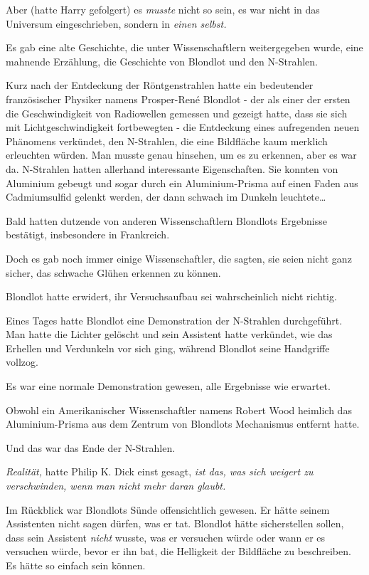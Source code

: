 {Aber (hatte Harry gefolgert) es \emph{musste} nicht so sein, es war nicht in das Universum eingeschrieben, sondern in \emph{einen selbst.}

Es gab eine alte Geschichte, die unter Wissenschaftlern weitergegeben wurde, eine mahnende Erzählung, die Geschichte von Blondlot und den N-Strahlen.

Kurz nach der Entdeckung der Röntgenstrahlen hatte ein bedeutender französischer Physiker namens Prosper-René Blondlot - der als einer der ersten die Geschwindigkeit von Radiowellen gemessen und gezeigt hatte, dass sie sich mit Lichtgeschwindigkeit fortbewegten - die Entdeckung eines aufregenden neuen Phänomens verkündet, den N-Strahlen, die eine Bildfläche kaum merklich erleuchten würden. Man musste genau hinsehen, um es zu erkennen, aber es war da. N-Strahlen hatten allerhand interessante Eigenschaften. Sie konnten von Aluminium gebeugt und sogar durch ein Aluminium-Prisma auf einen Faden aus Cadmiumsulfid gelenkt werden, der dann schwach im Dunkeln leuchtete…

Bald hatten dutzende von anderen Wissenschaftlern Blondlots Ergebnisse bestätigt, insbesondere in Frankreich.

Doch es gab noch immer einige Wissenschaftler, die sagten, sie seien nicht ganz sicher, das schwache Glühen erkennen zu können.

Blondlot hatte erwidert, ihr Versuchsaufbau sei wahrscheinlich nicht richtig.

Eines Tages hatte Blondlot eine Demonstration der N-Strahlen durchgeführt. Man hatte die Lichter gelöscht und sein Assistent hatte verkündet, wie das Erhellen und Verdunkeln vor sich ging, während Blondlot seine Handgriffe vollzog.

Es war eine normale Demonstration gewesen, alle Ergebnisse wie erwartet.

Obwohl ein Amerikanischer Wissenschaftler namens Robert Wood heimlich das Aluminium-Prisma aus dem Zentrum von Blondlots Mechanismus entfernt hatte.

Und das war das Ende der N-Strahlen.

\emph{Realität,} hatte Philip K. Dick einst gesagt, \emph{ist das, was sich weigert zu verschwinden, wenn man nicht mehr daran glaubt.}

Im Rückblick war Blondlots Sünde offensichtlich gewesen. Er hätte seinem Assistenten nicht sagen dürfen, was er tat. Blondlot hätte sicherstellen sollen, dass sein Assistent \emph{nicht} wusste, was er versuchen würde oder wann er es versuchen würde, bevor er ihn bat, die Helligkeit der Bildfläche zu beschreiben. Es hätte so einfach sein können.

}
